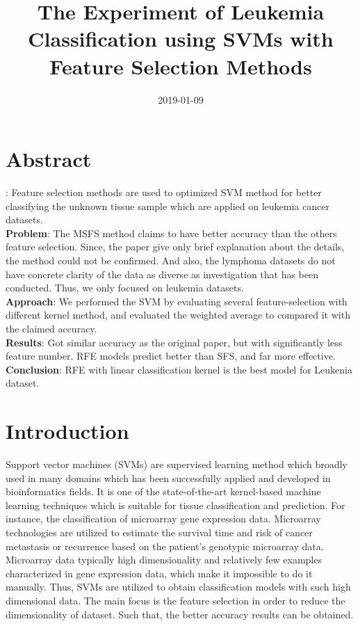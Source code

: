 \documentclass[a4paper,twocolumn]{article} %
\begin{document}
	\title{The Experiment of Leukemia Classification using SVMs with Feature Selection Methods}
	\author{}
	\date{2019-01-09} %
	
	\maketitle                     %
	\section*{Abstract}
	\label{sec:abs}
	: Feature selection methods are used to optimized SVM method for better classifying the unknown tissue sample which are applied on leukemia cancer datasets.\\
	{\bf Problem}: The MSFS method claims to have better accuracy than the others feature selection. Since, the paper give only brief explanation about the details, the method could not be confirmed. And also, the lymphoma datasets do not have concrete clarity of the data as diverse as investigation that has been conducted. Thus, we only focused on leukemia datasets.\\
	{\bf Approach}: We performed the SVM by evaluating several feature-selection with different kernel method, and evaluated the weighted average to compared it with the claimed accuracy.\\
	{\bf Results}: Got similar accuracy as the original paper, but with significantly less feature number. RFE models predict better than SFS, and far more effective.\\
	{\bf Conclusion}: RFE with linear classification kernel is the best model for Leukenia dataset.
	
	\section*{Introduction}
	\label{sec:intro}
	Support vector machines (SVMs) are supervised learning method which broadly used in many domains which has been successfully applied and developed in bioinformatics fields. It is one of the state-of-the-art kernel-based machine learning techniques which is suitable for tissue classification and prediction. For instance, the classification of microarray gene expression data. 
	Microarray technologies are utilized to estimate the survival time and risk of cancer metastasis or recurrence based on the patient's genotypic microarray data. Microarray data typically high dimensionality and relatively few examples characterized in gene expression data, which make it impossible to do it manually. Thus, SVMs are utilized to obtain classification models with such high dimensional data. The main focus is the feature selection in order to reduce the dimensionality of dataset. Such that, the better accuracy results can be obtained.
	
\end{document}
